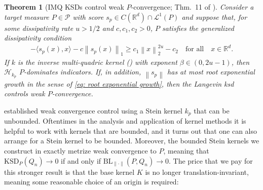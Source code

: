 \documentclass[12pt,paper=letter]{scrreprt}
\newtheorem{theorem}{Theorem}[chapter]
\newcommand{\qtext}[1]{\quad\text{#1}\quad}
\def\R{\mathbb{R}}
\def\norm#1{\left\|{#1}\right\|} %
\newcommand{\onenorm}[1]{\norm{#1}_1} %
\newcommand{\twonorm}[1]{\norm{#1}_2} %
\newcommand{\inner}[2]{\langle{#1},{#2}\rangle} %
\newcommand{\Pset}[0]{\mathcal{P}} %
\newcommand{\p}{p} %
\renewcommand{\k}{k}
\newcommand{\kb}{\k} %
\newcommand{\ks}{\k_{\p}}%
\def\H{\mathcal{H}}
\newcommand{\Hks}{\H_{\ks}}
\begin{document}
\begin{theorem}[IMQ KSDs control weak $P$-convergence; Thm.~11 of \citealp{barp2022targeted}] \label{imq-tightness}
Consider a target measure $P\in\Pset$ with score $s_p \in C(\R^d) \cap \mathcal{L}^1(P)$ and suppose that, for some dissipativity rate $u > 1/2$ and $c, c_1,c_2 > 0$, $P$ satisfies the \emph{generalized dissipativity} condition 
\begin{align}
    \label{eq:generalized-dissipativity}
-\inner{s_p( x)}{ x} - c \onenorm{s_p( x)}\geq c_1\twonorm{ x}^{2u} - c_2 \qtext{for all}  x\in\R^d.
\end{align}
If $\kb$ is the inverse multi-quadric kernel () with exponent $\beta \in (0, 2u-1)$, then $\Hks$ $P$-dominates indicators.
If, in addition, $\norm{s_p}$ has at most  root exponential growth in the sense of \eqref{eq: root exponential growth}, then the Langevin \ac{ksd} controls weak $P$-convergence.
\end{theorem}

 established weak convergence control using a Stein kernel $k_p$ that can be unbounded.
Oftentimes in the analysis and application of kernel methods it is helpful to work with kernels that are bounded, and it turns out that one can also arrange for a Stein kernel to be bounded.
Moreover, the bounded Stein kernels we construct in  exactly metrize weak convergence to $P$, meaning that $\mathrm{KSD}_P(Q_n) \rightarrow 0$ if and only if $\mathrm{BL}_{\|\cdot\|}(P,Q_n) \rightarrow 0$.
The price that we pay for this stronger result is that the base kernel $K$ is no longer translation-invariant, meaning some reasonable choice of an origin is required:
\end{document}
